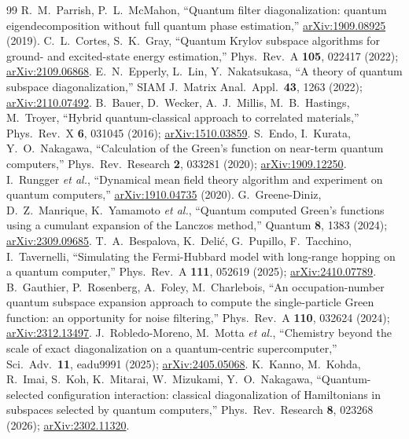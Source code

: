 \begin{thebibliography}{99}
 R.~M.~Parrish, P.~L.~McMahon, ``Quantum filter diagonalization: quantum eigendecomposition without full quantum phase estimation,'' \href{https://arxiv.org/abs/1909.08925}{arXiv:1909.08925} (2019).
 C.~L.~Cortes, S.~K.~Gray, ``Quantum Krylov subspace algorithms for ground- and excited-state energy estimation,'' Phys.\ Rev.\ A \textbf{105}, 022417 (2022); \href{https://arxiv.org/abs/2109.06868}{arXiv:2109.06868}.
 E.~N.~Epperly, L.~Lin, Y.~Nakatsukasa, ``A theory of quantum subspace diagonalization,'' SIAM J.\ Matrix Anal.\ Appl.\ \textbf{43}, 1263 (2022); \href{https://arxiv.org/abs/2110.07492}{arXiv:2110.07492}.
 B.~Bauer, D.~Wecker, A.~J.~Millis, M.~B.~Hastings, M.~Troyer, ``Hybrid quantum-classical approach to correlated materials,'' Phys.\ Rev.\ X \textbf{6}, 031045 (2016); \href{https://arxiv.org/abs/1510.03859}{arXiv:1510.03859}.
 S.~Endo, I.~Kurata, Y.~O.~Nakagawa, ``Calculation of the Green's function on near-term quantum computers,'' Phys.\ Rev.\ Research \textbf{2}, 033281 (2020); \href{https://arxiv.org/abs/1909.12250}{arXiv:1909.12250}.
 I.~Rungger \emph{et al.}, ``Dynamical mean field theory algorithm and experiment on quantum computers,'' \href{https://arxiv.org/abs/1910.04735}{arXiv:1910.04735} (2020).
 G.~Greene-Diniz, D.~Z.~Manrique, K.~Yamamoto \emph{et al.}, ``Quantum computed Green's functions using a cumulant expansion of the Lanczos method,'' Quantum \textbf{8}, 1383 (2024); \href{https://arxiv.org/abs/2309.09685}{arXiv:2309.09685}.
 T.~A.~Bespalova, K.~Deli\'c, G.~Pupillo, F.~Tacchino, I.~Tavernelli, ``Simulating the Fermi-Hubbard model with long-range hopping on a quantum computer,'' Phys.\ Rev.\ A \textbf{111}, 052619 (2025); \href{https://arxiv.org/abs/2410.07789}{arXiv:2410.07789}.
 B.~Gauthier, P.~Rosenberg, A.~Foley, M.~Charlebois, ``An occupation-number quantum subspace expansion approach to compute the single-particle Green function: an opportunity for noise filtering,'' Phys.\ Rev.\ A \textbf{110}, 032624 (2024); \href{https://arxiv.org/abs/2312.13497}{arXiv:2312.13497}.
 J.~Robledo-Moreno, M.~Motta \emph{et al.}, ``Chemistry beyond the scale of exact diagonalization on a quantum-centric supercomputer,'' Sci.\ Adv.\ \textbf{11}, eadu9991 (2025); \href{https://arxiv.org/abs/2405.05068}{arXiv:2405.05068}.
 K.~Kanno, M.~Kohda, R.~Imai, S.~Koh, K.~Mitarai, W.~Mizukami, Y.~O.~Nakagawa, ``Quantum-selected configuration interaction: classical diagonalization of Hamiltonians in subspaces selected by quantum computers,'' Phys.\ Rev.\ Research \textbf{8}, 023268 (2026); \href{https://arxiv.org/abs/2302.11320}{arXiv:2302.11320}.

\end{thebibliography}

